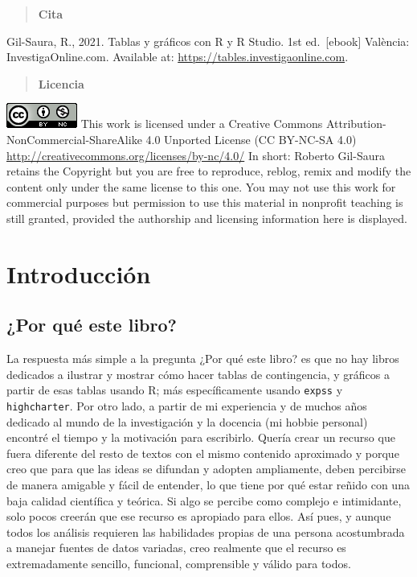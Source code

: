 \documentclass[
]{book}
\begin{document}
\begin{quote}
\textbf{Cita}
\end{quote}

Gil-Saura, R., 2021. Tablas y gráficos con R y R Studio. 1st ed.~{[}ebook{]} València: InvestigaOnline.com. Available at: \url{https://tables.investigaonline.com}.

\begin{quote}
\textbf{Licencia}
\end{quote}

\includegraphics{data/88x31.png}
This work is licensed under a Creative Commons Attribution-NonCommercial-ShareAlike 4.0 Unported License (CC BY-NC-SA 4.0) \url{http://creativecommons.org/licenses/by-nc/4.0/} In short: Roberto Gil-Saura retains the Copyright but you are free to reproduce, reblog, remix and modify the content only under the same license to this one. You may not use this work for commercial purposes
but permission to use this material in nonprofit teaching is still granted, provided the authorship and licensing information here is displayed.


\hypertarget{introducciuxf3n}{%
\chapter{Introducción}\label{introducciuxf3n}}

\hypertarget{por-quuxe9-este-libro}{%
\section{¿Por qué este libro?}\label{por-quuxe9-este-libro}}

La respuesta más simple a la pregunta ¿Por qué este libro? es que no hay libros dedicados a ilustrar y mostrar cómo hacer tablas de contingencia, y gráficos a partir de esas tablas usando R; más específicamente usando \texttt{expss} y \texttt{highcharter}. Por otro lado, a partir de mi experiencia y de muchos años dedicado al mundo de la investigación y la docencia (mi hobbie personal) encontré el tiempo y la motivación para escribirlo. Quería crear un recurso que fuera diferente del resto de textos con el mismo contenido aproximado y porque creo que para que las ideas se difundan y adopten ampliamente, deben percibirse de manera amigable y fácil de entender, lo que tiene por qué estar reñido con una baja calidad científica y teórica. Si algo se percibe como complejo e intimidante, solo pocos creerán que ese recurso es apropiado para ellos. Así pues, y aunque todos los análisis requieren las habilidades propias de una persona acostumbrada a manejar fuentes de datos variadas, creo realmente que el recurso es extremadamente sencillo, funcional, comprensible y válido para todos.
\end{document}
